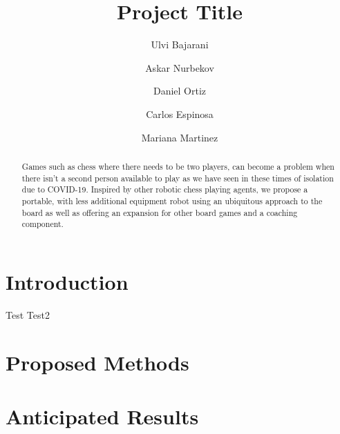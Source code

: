 \documentclass[manuscript,screen,review]{style}
\begin{document}
\title{Project Title}


\author{Ulvi Bajarani}

\author{Askar Nurbekov}

\author{Daniel Ortiz}

\author{Carlos Espinosa}

\author{Mariana Martinez}


\renewcommand{\shortauthors}{U. Bajarani, A. Nurbekov, D. Ortiz, C. Espinosa \& M. Martinez}


\begin{abstract}
Games such as chess where there needs to be two players, can become a problem when there isn’t a second person available to play as we have seen in these times of isolation due to COVID-19. Inspired by other robotic chess playing agents, we propose a portable, with less additional equipment robot using an ubiquitous approach to the board as well as offering an expansion for other board games and a coaching component.
\end{abstract}




\maketitle


\section*{Introduction}

Test \cite{chen2019robust} Test2 \cite{rath2019autonomous}

\section*{Proposed Methods}



\section*{Anticipated Results}






\end{document}
